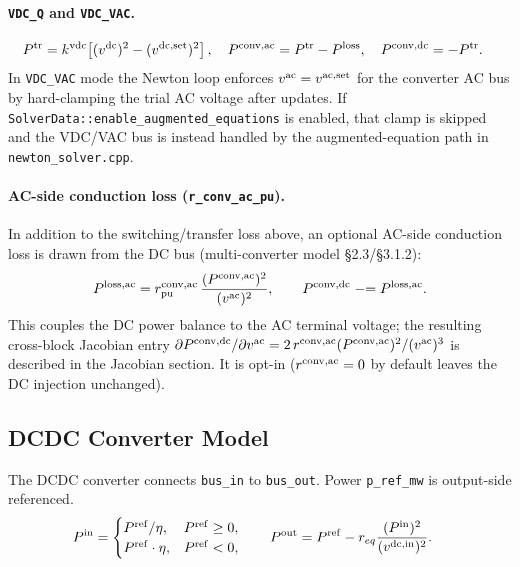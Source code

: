 \paragraph{\texttt{VDC\_Q} and \texttt{VDC\_VAC}.}
\begin{align}
P^{\mathrm{tr}} &= k^{\mathrm{vdc}}\!\left[(v^{\mathrm{dc}})^2-(v^{\mathrm{dc,set}})^2\right],\quad
P^{\mathrm{conv,ac}} = P^{\mathrm{tr}} - P^{\mathrm{loss}},\quad
P^{\mathrm{conv,dc}} = -P^{\mathrm{tr}}.
\end{align}
In \texttt{VDC\_VAC} mode the Newton loop enforces
\(v^{\mathrm{ac}}=v^{\mathrm{ac,set}}\) for the converter AC bus by hard-clamping
the trial AC voltage after updates.  If \texttt{SolverData::enable\_augmented\_equations}
is enabled, that clamp is skipped and the VDC/VAC bus is instead handled by
the augmented-equation path in \texttt{newton\_solver.cpp}.

\paragraph{AC-side conduction loss (\texttt{r\_conv\_ac\_pu}).}
In addition to the switching/transfer loss above, an optional AC-side conduction
loss is drawn from the DC bus (multi-converter model \S2.3/\S3.1.2):
\[
P^{\mathrm{loss,ac}} = r^{\mathrm{conv,ac}}_{\text{pu}}\,
\frac{(P^{\mathrm{conv,ac}})^2}{(v^{\mathrm{ac}})^2},
\qquad
P^{\mathrm{conv,dc}} \mathrel{-}= P^{\mathrm{loss,ac}}.
\]
This couples the DC power balance to the AC terminal voltage; the resulting
cross-block Jacobian entry
\(\partial P^{\mathrm{conv,dc}}/\partial v^{\mathrm{ac}}
= 2\,r^{\mathrm{conv,ac}} (P^{\mathrm{conv,ac}})^2/(v^{\mathrm{ac}})^3\)
is described in the Jacobian section.  It is opt-in
(\(r^{\mathrm{conv,ac}}=0\) by default leaves the DC injection unchanged).

\subsection{DCDC Converter Model}

The DCDC converter connects \texttt{bus\_in} to \texttt{bus\_out}.
Power \texttt{p\_ref\_mw} is output-side referenced.
\begin{align}
P^{\mathrm{in}} &=
\begin{cases}
P^{\mathrm{ref}}/\eta, & P^{\mathrm{ref}}\ge 0, \\
P^{\mathrm{ref}}\cdot\eta, & P^{\mathrm{ref}}<0,
\end{cases}
\qquad
P^{\mathrm{out}} = P^{\mathrm{ref}} - r_{eq}\frac{(P^{\mathrm{in}})^2}{(v^{\mathrm{dc,in}})^2}.
\end{align}


